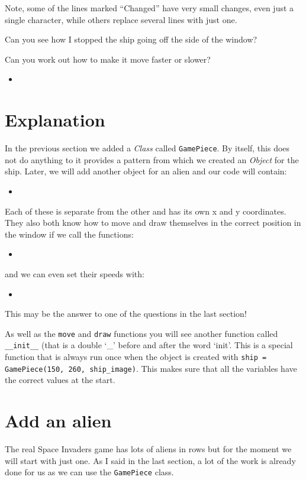 \documentclass{article}
\newcommand{\pythonscript}[2]{
\begin{itemize}
\item[]
\end{itemize}
}
\newenvironment{hint}{
  \begin{tcolorbox}[colback=green!5,colframe=green!40!black,title=Note]}
{\end{tcolorbox}}
\begin{document}
\begin{hint}
Note, some of the lines marked ``Changed'' have very small changes, even just a
single character, while others replace several lines with just one.

Can you see how I stopped the ship going off the side of the window?

Can you work out how to make it move faster or slower?
\end{hint}

\pythonscript{classes}{Adding classes}

\section{Explanation}

In the previous section we added a \emph{Class} called \texttt{GamePiece}.
By itself, this does not do anything to it provides a pattern from which
we created an \emph{Object} for the ship. Later, we will add another object
for an alien and our code will contain:

\pythonscript{explanation1}{Object creation example}

Each of these is separate from the other and has its own x and y coordinates.
They also both know how to move and draw themselves in the correct position
in the window if we call the functions:

\pythonscript{explanation2}{Function call example}

and we can even set their speeds with:

\pythonscript{explanation3}{Setting object variables}

\begin{hint}
This may be the answer to one of the questions in the last section!
\end{hint}

As well as the \texttt{move} and \texttt{draw} functions you will see another
function called \texttt{\_\_init\_\_} (that is a double `\_' before and after
the word `init'. This is a special function that is always run once when the
object is created with \texttt{ship = GamePiece(150, 260, ship\_image)}.
This makes sure that all the variables have the correct values at the start.

\section{Add an alien}

The real Space Invaders game has lots of aliens in rows but for the moment we
will start with just one. As I said in the last section, a lot of the work is
already done for us as we can use the \texttt{GamePiece} class.
\end{document}
